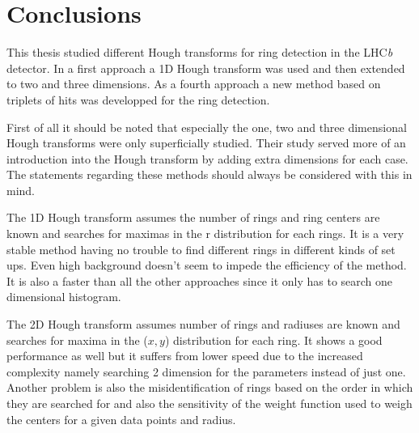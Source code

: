 \documentclass[11pt]{scrreprt}
\begin{document}

\chapter{Conclusions} %
\label{cha:conclusions}

This thesis studied different Hough transforms for ring detection in the LHC\textit{b} detector. In a first approach a 1D Hough 
transform was used and then extended to two and three dimensions.
As a fourth approach a new method based on triplets of hits was developped for the ring detection. 

First of all it should be noted that especially the one, two and three dimensional Hough transforms were only superficially studied. Their study served more of an introduction into the Hough transform by adding extra dimensions for each case. The statements regarding these methods should always be considered with this in mind.

The 1D Hough transform assumes the number of rings and ring centers are known and searches for maximas in the r distribution for each rings.
It is a very stable method having no trouble to find different rings in different kinds of set ups. Even high background doesn't seem to impede the efficiency of the method. It is also a faster than all the other approaches since it only has to search one dimensional histogram.

The 2D Hough transform assumes number of rings and radiuses are known and searches for maxima in the ($x,y$) distribution for each ring. It shows a good performance as well but it suffers from lower speed due to the increased complexity namely searching
2 dimension for the parameters instead of just one. Another problem is also the misidentification of rings based on the order in which
they are searched for and also the sensitivity of the weight function used to weigh the centers for a given data points and radius.
\end{document}
